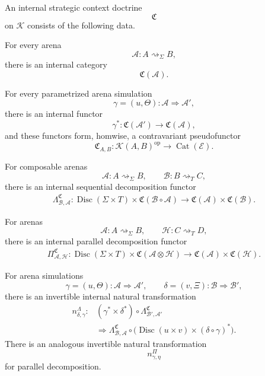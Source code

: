 \begin{definition}
\label{def:strategic-context-doctrine}
An internal strategic context doctrine
\[
  \mathfrak C
\]
on \(\mathcal K\) consists of the following data.

For every arena
\[
  \mathcal A:A\rightsquigarrow_\Sigma B,
\]
there is an internal category
\[
  \mathfrak C(\mathcal A).
\]

For every parametrized arena simulation
\[
  \gamma=(u,\Theta):
  \mathcal A\Longrightarrow\mathcal A',
\]
there is an internal functor
\[
  \gamma^*:
  \mathfrak C(\mathcal A')
  \longrightarrow
  \mathfrak C(\mathcal A),
\]
and these functors form, homwise, a contravariant pseudofunctor
\[
  \mathfrak C_{A,B}:
  \mathcal K(A,B)^{\mathrm{op}}
  \longrightarrow
  \operatorname{Cat}(\mathcal E).
\]

For composable arenas
\[
  \mathcal A:A\rightsquigarrow_\Sigma B,
  \qquad
  \mathcal B:B\rightsquigarrow_T C,
\]
there is an internal sequential decomposition functor
\[
\begin{aligned}
  \Lambda^{\mathfrak C}_{\mathcal B,\mathcal A}:
  \operatorname{Disc}(\Sigma\times T)
  \times
  \mathfrak C(\mathcal B\circ\mathcal A)
  \longrightarrow
  \mathfrak C(\mathcal A)
  \times
  \mathfrak C(\mathcal B).
\end{aligned}
\]

For arenas
\[
  \mathcal A:A\rightsquigarrow_\Sigma B,
  \qquad
  \mathcal H:C\rightsquigarrow_T D,
\]
there is an internal parallel decomposition functor
\[
\begin{aligned}
  \Pi^{\mathfrak C}_{\mathcal A,\mathcal H}:
  \operatorname{Disc}(\Sigma\times T)
  \times
  \mathfrak C(\mathcal A\otimes\mathcal H)
  \longrightarrow
  \mathfrak C(\mathcal A)
  \times
  \mathfrak C(\mathcal H).
\end{aligned}
\]

For arena simulations
\[
  \gamma=(u,\Theta):
  \mathcal A\Longrightarrow\mathcal A',
  \qquad
  \delta=(v,\Xi):
  \mathcal B\Longrightarrow\mathcal B',
\]
there is an invertible internal natural transformation
\[
\begin{aligned}
  n^{\Lambda}_{\delta,\gamma}:&
  (\gamma^*\times\delta^*)
  \circ
  \Lambda^{\mathfrak C}_{\mathcal B',\mathcal A'}
  \\
  &\Longrightarrow
  \Lambda^{\mathfrak C}_{\mathcal B,\mathcal A}
  \circ
  \bigl(
    \operatorname{Disc}(u\times v)
    \times
    (\delta\circ\gamma)^*
  \bigr).
\end{aligned}
\]
There is an analogous invertible natural transformation
\[
  n^{\Pi}_{\gamma,\eta}
\]
for parallel decomposition.


\end{definition}
